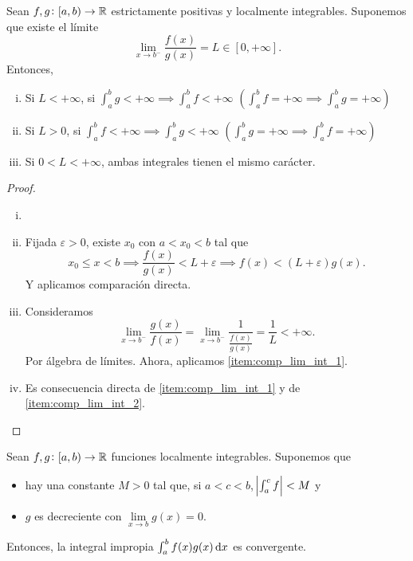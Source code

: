 \begin{prop}
    Sean $f,g \colon [a,b) \to \mathbb{R}$ estrictamente positivas y localmente
    integrables. Suponemos que existe el límite
    \[
        \lim_{x \to b^-} \frac{f(x)}{g(x)} = L \in [0,+\infty].
    \]
    Entonces, \begin{enumerate}[i)]
        \item\label{item:comp_lim_int_1}
            Si $L < +\infty$, si $\int^b_a g < +\infty \implies \int^b_af <
            +\infty$ $\left( \int^b_a f = +\infty \implies \int^b_a g =
            +\infty\right)$
        \item\label{item:comp_lim_int_2}
            Si $L > 0$, si $\int^b_a f < +\infty \implies \int^b_a g <
            +\infty$ $\left(\int^b_a g = +\infty \implies \int^b_a f =
            +\infty\right)$
        \item Si $0 < L < +\infty$, ambas integrales tienen el mismo carácter.
    \end{enumerate}
\end{prop}
\pagebreak                                  %
\begin{proof}
    \begin{enumerate}[i)]
        \item[]
        \item Fijada $\varepsilon > 0$, existe $x_0$ con $a < x_0 < b$ tal que
            \[
                x_0 \leq x < b \implies \frac{f(x)}{g(x)} < L +
                \varepsilon \implies f(x) < (L+\varepsilon)g(x).
            \]
            Y aplicamos comparación directa.
        \item Consideramos
            \[
                \lim_{x \to b^-} \frac{g(x)}{f(x)} = \lim_{x \to b^-}
                \frac{1}{\frac{f(x)}{g(x)}} = \frac{1}{L} < +\infty.
            \]
            Por álgebra de límites. Ahora, aplicamos
            \ref{item:comp_lim_int_1}.
        \item Es consecuencia directa de \ref{item:comp_lim_int_1} y de
            \ref{item:comp_lim_int_2}.
    \end{enumerate}
\end{proof}

\begin{prop}
    Sean $f,g \colon [a,b) \to \mathbb{R}$ funciones localmente integrables. Suponemos
    que
    \begin{itemize}
        \item hay una constante $M > 0$ tal que, si $a < c < b$,
            $\abs{\int^c_a f} < M$ y
        \item $g$ es decreciente con $\lim\limits_{x \to b} g(x) = 0$.
    \end{itemize}
    Entonces, la integral impropia $\int^b_a f(x)g(x)\dif x$ es convergente.
\end{prop}

